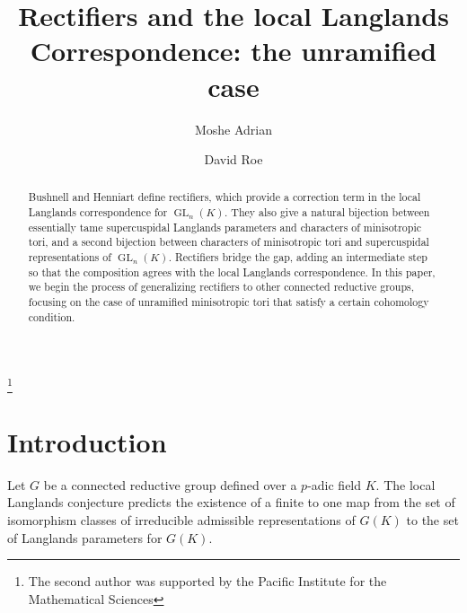 \documentclass{mrlart7}
\theoremstyle{plain}
\theoremstyle{definition}
\numberwithin{equation}{section}
\DeclareMathOperator{\GL}{GL}
\begin{document}
\title[Rectifiers and the local Langlands Correspondence]{Rectifiers and the local Langlands Correspondence: the unramified case}
\author{Moshe Adrian}
\address{Department of Mathematics \\ University of Toronto \\ Toronto, ON M5S 2E4, Canada}
\author{David Roe}
\address{Department of Mathematics \\ University of British Columbia \\ Vancouver, BC V6K 1Z2, Canada}
\thanks{The second author was supported by the Pacific Institute for the Mathematical Sciences}


\begin{abstract}

Bushnell and Henniart define rectifiers, which provide a correction term
in the local Langlands correspondence for $\GL_n(K)$.  They also give a natural bijection
between essentially tame supercuspidal Langlands parameters
and characters of minisotropic tori, and a second bijection between characters
of minisotropic tori and supercuspidal representations of $\GL_n(K)$.  Rectifiers
bridge the gap, adding an intermediate step so that the composition agrees
with the local Langlands correspondence.
In this paper, we begin the process of generalizing rectifiers to other
connected reductive groups, focusing on the case of unramified minisotropic
tori that satisfy a certain cohomology condition.

\end{abstract}

\maketitle

\section{Introduction} \label{section:intro}

Let $G$ be a connected reductive group defined over a $p$-adic field $K$.
The local Langlands conjecture predicts the existence of a finite to one map
from the set of isomorphism classes of irreducible admissible representations
of $G(K)$ to the set of Langlands parameters for $G(K)$.
\end{document}
